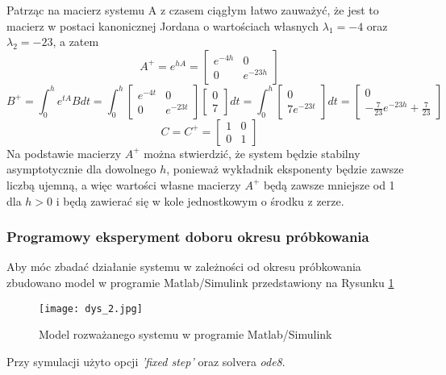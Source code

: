 \documentclass[a4paper,11pt]{article}
\begin{document}
Patrząc na macierz systemu A z czasem ciągłym łatwo zauważyć, że jest to macierz w postaci kanonicznej Jordana o wartościach własnych \( \lambda_{1} = -4 \) oraz \( \lambda_{2} = -23 \), a zatem
\begin{equation*}
A^{+} = e^{hA} = \begin{bmatrix}
e^{-4h} & 0 \\
0 & e^{-23h} 
\end{bmatrix}
\end{equation*}
\begin{equation*}
B^{+} = \int_{0}^{h}e^{tA}Bdt = \int_{0}^{h} \begin{bmatrix}
e^{-4t} & 0 \\
0 & e^{-23t} 
\end{bmatrix}
\begin{bmatrix}
0 \\ 7
\end{bmatrix}
dt=
\int_{0}^{h}\begin{bmatrix}
0 \\ 7e^{-23t}
\end{bmatrix}
dt =
\begin{bmatrix}
0 \\
-\frac{7}{23}e^{-23h}+\frac{7}{23}
\end{bmatrix}
\end{equation*}
\begin{equation*}
C=C^{+}=\begin{bmatrix}
1 & 0 \\ 
0 & 1
\end{bmatrix}
\end{equation*}
Na podstawie macierzy \( A^{+} \) można stwierdzić, że system będzie stabilny asymptotycznie dla dowolnego \(h\), ponieważ wykładnik eksponenty będzie zawsze liczbą ujemną, a więc wartości własne macierzy \(A^{+}\) będą zawsze mniejsze od 1 dla \(h > 0\) i będą zawierać się w kole jednostkowym o środku z zerze.

\subsubsection{Programowy eksperyment doboru okresu próbkowania}
Aby móc zbadać działanie systemu w zależności od okresu próbkowania zbudowano model w programie Matlab/Simulink przedstawiony na Rysunku \ref{fig:dys_2}
\begin{figure}[H]
\centerline{\texttt{[image: dys\_2.jpg]}}
\caption{Model rozważanego systemu w programie Matlab/Simulink}
\label{fig:dys_2}
\end{figure}
Przy symulacji użyto opcji \textit{'fixed step'} oraz solvera \textit{ode8}. 
\end{document}
